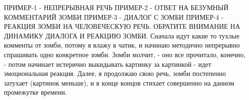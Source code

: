 ПРИМЕР-1 - НЕПРЕРЫВНАЯ РЕЧЬ
ПРИМЕР-2 - ОТВЕТ НА БЕЗУМНЫЙ КОММЕНТАРИЙ ЗОМБИ
ПРИМЕР-3 - ДИАЛОГ С ЗОМБИ
ПРИМЕР-4 - РЕАКЦИЯ ЗОМБИ НА ЧЕЛОВЕЧЕСКУЮ РЕЧЬ. ОБРАТИТЕ ВНИМАНИЕ НА ДИНАМИКУ
ДИАЛОГА И РЕАКЦИЮ ЗОМБИ. Сначала идут какие то тухлые комменты от зомби, потому
я влажу в чатик, и начинаю методично  непрерывно спрашивать одно конкретное
зомби. Зомби молчит, - оно все прочитало, конечно, - потом начинает истерично
выкидывать картинку за картинкой - идет эмоциональная реакция. Далее, я
продолжаю свою речь, зомби постепенно затухает (картинок меньше), и в конце
концов стихает совершенно на данном промежутке времени.

